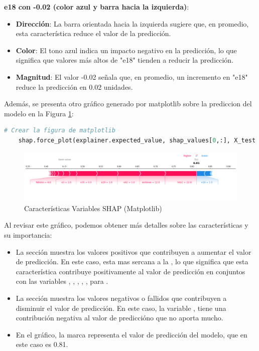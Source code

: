 \textbf{e18 con -0.02 (color azul y barra hacia la izquierda)}:
\begin{itemize}
    \item \textbf{Dirección}: La barra orientada hacia la izquierda sugiere que, en promedio, esta característica reduce el valor de la predicción.
    \item \textbf{Color}: El tono azul indica un impacto negativo en la predicción, lo que significa que valores más altos de "e18" tienden a reducir la predicción.
    \item \textbf{Magnitud}: El valor -0.02 señala que, en promedio, un incremento en "e18" reduce la predicción en 0.02 unidades.
\end{itemize}


Además, se presenta otro gráfico generado por matplotlib sobre la prediccion del modelo en la Figura \ref{fig:caract_var_shap_mat}:

\begin{lstlisting}[language=Python, caption=grafico matplotib, label=lst:graf_matplotib]
    # Crear la figura de matplotlib
    shap.force_plot(explainer.expected_value, shap_values[0,:], X_test.iloc[0,:], matplotlib=True)
\end{lstlisting}

\begin{figure}[H]
    \centering
    \includegraphics[width=1\textwidth]{img/shap_rf/shapForcePlot.png}
    \caption{Características Variables SHAP (Matplotlib)}
    \label{fig:caract_var_shap_mat}
\end{figure}

Al revisar este gráfico, podemos obtener más detalles sobre las características y su importancia:

\begin{itemize}
    \item La sección  muestra los valores positivos que contribuyen a aumentar el valor de predicción. En este caso,  esta mas sercana a la , lo que significa que esta característica contribuye positivamente al valor de predicción en conjuntos con las variables , , , , ,  para .
    \item La sección  muestra los valores negativos o fallidos que contribuyen a disminuir el valor de predicción. En este caso, la variable , tiene una contribución negativa al valor de prediccióno que no aporta mucho.
    \item En el gráfico, la marca  representa el valor de predicción del modelo, que en este caso es 0.81.
\end{itemize}

